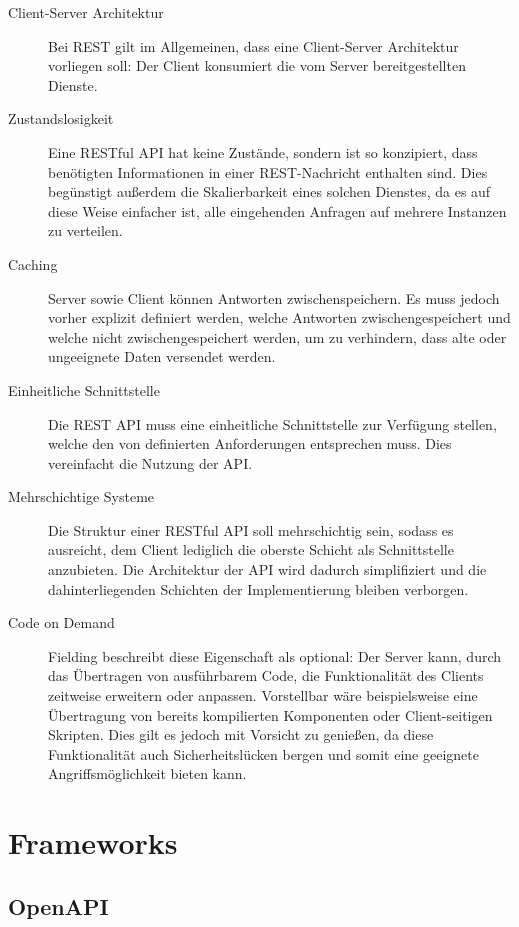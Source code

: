 		\begin{description}
			\item[Client-Server Architektur] 
				Bei \acs{REST} gilt im Allgemeinen, dass eine Client-Server Architektur vorliegen soll: Der Client konsumiert die vom Server bereitgestellten Dienste. 
			\item[Zustandslosigkeit] 
				Eine RESTful \acs{API} hat keine Zustände, sondern ist so konzipiert, dass benötigten Informationen in einer REST-Nachricht enthalten sind. Dies begünstigt außerdem die Skalierbarkeit eines solchen Dienstes, da es auf diese Weise einfacher ist, alle eingehenden Anfragen auf mehrere Instanzen zu verteilen.
			\item[Caching] 
				Server sowie Client können Antworten zwischenspeichern. Es muss jedoch vorher explizit definiert werden, welche Antworten zwischengespeichert und welche nicht zwischengespeichert werden, um zu verhindern, dass alte oder ungeeignete Daten versendet werden.
			\item[Einheitliche Schnittstelle]
				Die \acs{REST} \acs{API} muss eine einheitliche Schnittstelle zur Verfügung stellen, welche den von \cite{Fielding.2000} definierten Anforderungen entsprechen muss. Dies vereinfacht die Nutzung der \acs{API}.
			\item[Mehrschichtige Systeme]
				 Die Struktur einer RESTful \acs{API} soll mehrschichtig sein, sodass es ausreicht, dem Client lediglich die oberste Schicht als Schnittstelle anzubieten. Die Architektur der API wird dadurch simplifiziert und die dahinterliegenden Schichten der Implementierung bleiben verborgen.
			\item[Code on Demand] 
				Fielding beschreibt diese Eigenschaft als optional: Der Server kann, durch das Übertragen von ausführbarem Code, die Funktionalität des Clients zeitweise erweitern oder anpassen. Vorstellbar wäre beispielsweise eine Übertragung von bereits kompilierten Komponenten oder Client-seitigen Skripten. Dies gilt es jedoch mit Vorsicht zu genießen, da diese Funktionalität auch Sicherheitslücken bergen und somit eine geeignete Angriffsmöglichkeit bieten kann. 
				
		\end{description}

	\section{Frameworks}\label{sec:frameworks}
	
		\subsection{OpenAPI} %
		
